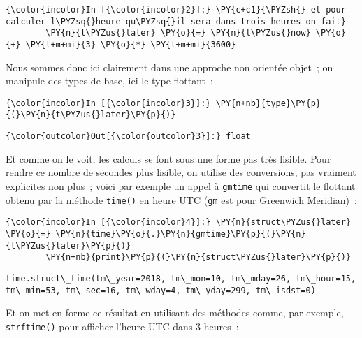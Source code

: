     \begin{Verbatim}[commandchars=\\\{\}]
{\color{incolor}In [{\color{incolor}2}]:} \PY{c+c1}{\PYZsh{} et pour calculer l\PYZsq{}heure qu\PYZsq{}il sera dans trois heures on fait}
        \PY{n}{t\PYZus{}later} \PY{o}{=} \PY{n}{t\PYZus{}now} \PY{o}{+} \PY{l+m+mi}{3} \PY{o}{*} \PY{l+m+mi}{3600}
\end{Verbatim}


    Nous sommes donc ici clairement dans une approche non orientée objet~;
on manipule des types de base, ici le type flottant~:

    \begin{Verbatim}[commandchars=\\\{\}]
{\color{incolor}In [{\color{incolor}3}]:} \PY{n+nb}{type}\PY{p}{(}\PY{n}{t\PYZus{}later}\PY{p}{)}
\end{Verbatim}


\begin{Verbatim}[commandchars=\\\{\}]
{\color{outcolor}Out[{\color{outcolor}3}]:} float
\end{Verbatim}
            
    Et comme on le voit, les calculs se font sous une forme pas très
lisible. Pour rendre ce nombre de secondes plus lisible, on utilise des
conversions, pas vraiment explicites non plus~; voici par exemple un
appel à \texttt{gmtime} qui convertit le flottant obtenu par la méthode
\texttt{time()} en heure UTC (\texttt{gm} est pour Greenwich Meridian)~:

    \begin{Verbatim}[commandchars=\\\{\}]
{\color{incolor}In [{\color{incolor}4}]:} \PY{n}{struct\PYZus{}later} \PY{o}{=} \PY{n}{time}\PY{o}{.}\PY{n}{gmtime}\PY{p}{(}\PY{n}{t\PYZus{}later}\PY{p}{)}
        \PY{n+nb}{print}\PY{p}{(}\PY{n}{struct\PYZus{}later}\PY{p}{)}
\end{Verbatim}


    \begin{Verbatim}[commandchars=\\\{\}]
time.struct\_time(tm\_year=2018, tm\_mon=10, tm\_mday=26, tm\_hour=15, tm\_min=53, tm\_sec=16, tm\_wday=4, tm\_yday=299, tm\_isdst=0)

    \end{Verbatim}

    Et on met en forme ce résultat en utilisant des méthodes comme, par
exemple, \texttt{strftime()} pour afficher l'heure UTC dans 3 heures~:


